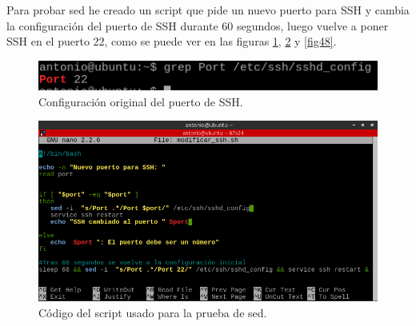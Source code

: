Para probar sed he creado un script que pide un nuevo puerto para SSH y cambia la configuración del puerto de SSH durante 60 segundos, luego vuelve a poner SSH en el puerto 22, como se puede ver en las figuras \ref{fig46}, \ref{fig47} y \ref{fig48}.\cite{sed}


\begin{figure}[H]
    \begin{center}
        \includegraphics[scale=0.8]{imagenes/img49}
        \caption{Configuración original del puerto de SSH.}
        \label{fig46}
    \end{center}
\end{figure}

\begin{figure}[H]
    \begin{center}
        \advance\leftskip-2cm
        \includegraphics[scale=0.65]{imagenes/img50}
        \caption{Código del script usado para la prueba de sed.}
        \label{fig47}
    \end{center}
\end{figure}


